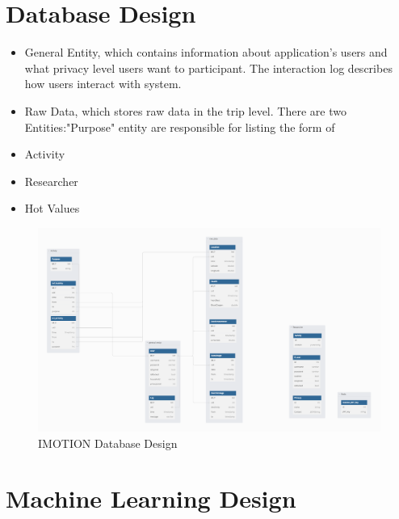 \documentclass[12pt,two side]{report}
\begin{document}
\section{Database Design}
\begin{itemize}
    \item General Entity, which contains information about application's users and what privacy level users want to participant. The interaction log describes how users interact with system.
    \item Raw Data, which stores raw data in the trip level. There are two Entities:"Purpose" entity are responsible for listing the form of 
    \item Activity
    \item Researcher
    \item Hot Values
\end{itemize}
\begin{figure}
\centering
\includegraphics[width=12cm]{background_report/figures/database.png}
\caption{IMOTION Database Design}
\label{figure:6}
\end{figure}
\section{Machine Learning Design}


\end{document}
